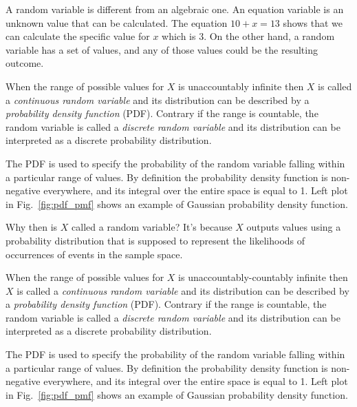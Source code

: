 A random variable is different from an algebraic one. An equation variable is an unknown value that can be calculated. The equation $10 + x = 13$ shows that we can calculate the specific value for $x$ which is 3. On the other hand, a random variable has a set of values, and any of those values could be the resulting outcome.

When the range of possible values for $X$ is unaccountably infinite then $X$ is called a \emph{continuous random variable} and its distribution can be described by a \emph{probability density function} (PDF). Contrary if the range is countable, the random variable is called a \emph{discrete random variable} and its distribution can be interpreted as a discrete probability distribution.

The PDF is used to specify the probability of the random variable falling within a particular range of values. By definition 
the probability density function is non-negative everywhere, and its integral over the entire space is equal to 1.
Left plot in Fig.~\ref{fig:pdf_pmf} shows an example of Gaussian probability density function.

Why then is $X$ called a random variable? It’s because $X$ outputs values using a probability distribution that is supposed to represent the likelihoods of occurrences of events in the sample space. 


When the range of possible values for $X$ is unaccountably-countably infinite then $X$ is called a \emph{continuous random variable} and its distribution can be described by a \emph{probability density function} (PDF). Contrary if the range is countable, the random variable is called a \emph{discrete random variable} and its distribution can be interpreted as a discrete probability distribution.

The PDF is used to specify the probability of the random variable falling within a particular range of values. By definition 
the probability density function is non-negative everywhere, and its integral over the entire space is equal to 1.
Left plot in Fig.~\ref{fig:pdf_pmf} shows an example of Gaussian probability density function.

